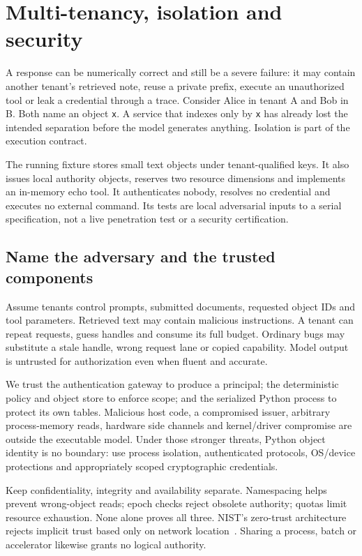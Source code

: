 \chapter{Multi-tenancy, isolation and security}
\label{evod45:chapter}

A response can be numerically correct and still be a severe failure: it may
contain another tenant's retrieved note, reuse a private prefix, execute an
unauthorized tool or leak a credential through a trace. Consider Alice in
tenant A and Bob in B. Both name an object \texttt{x}. A service that indexes
only by \texttt{x} has already lost the intended separation before the model
generates anything. Isolation is part of the execution contract.

The running fixture stores small text objects under tenant-qualified keys.
It also issues local authority objects, reserves two resource dimensions and
implements an in-memory echo tool. It authenticates nobody, resolves no
credential and executes no external command. Its tests are local adversarial
inputs to a serial specification, not a live penetration test or a security
certification.

\section{Name the adversary and the trusted components}
\label{evod45:threat}
Assume tenants control prompts, submitted documents, requested object IDs and
tool parameters. Retrieved text may contain malicious instructions. A tenant
can repeat requests, guess handles and consume its full budget. Ordinary bugs
may substitute a stale handle, wrong request lane or copied capability.
Model output is untrusted for authorization even when fluent and accurate.

We trust the authentication gateway to produce a principal; the deterministic
policy and object store to enforce scope; and the serialized Python process
to protect its own tables. Malicious host code, a compromised issuer, arbitrary
process-memory reads, hardware side channels and kernel/driver compromise are
outside the executable model. Under those stronger threats, Python object
identity is no boundary: use process isolation, authenticated protocols,
OS/device protections and appropriately scoped cryptographic credentials.

Keep confidentiality, integrity and availability separate. Namespacing helps
prevent wrong-object reads; epoch checks reject obsolete authority; quotas
limit resource exhaustion. None alone proves all three. NIST's zero-trust
architecture rejects implicit trust based only on network location~\cite{nist45}.
Sharing a process, batch or accelerator likewise grants no logical authority.

